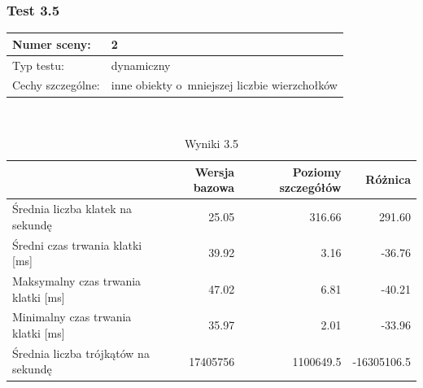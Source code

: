 \documentclass[a4paper,twoside,12pt]{book}
\begin{document}
\subsubsection{Test 3.5}
\begin{tabular}{|l||l|}
\hline
Numer sceny: & 2 \\
\hline
Typ testu: & dynamiczny \\
\hline
Cechy szczególne: & inne obiekty o~mniejszej liczbie wierzchołków \\
\hline
\end{tabular}\\

\begin{table}[H]
    \centering
    \caption{Wyniki 3.5}
    \label{tab:lod_test5}
    \begin{tabular}{|l||r|r|r|}
        \hline
        & Wersja bazowa & Poziomy szczegółów & Różnica \\
        \hline
        Średnia liczba klatek na sekundę & 25.05 & 316.66 & 291.60 \\
        \hline
        Średni czas trwania klatki [ms] & 39.92 & 3.16 & -36.76 \\
        \hline
        Maksymalny czas trwania klatki [ms] & 47.02 & 6.81 & -40.21 \\
        \hline
        Minimalny czas trwania klatki [ms] & 35.97 & 2.01 & -33.96 \\
        \hline
        Średnia liczba trójkątów na sekundę & 17405756 & 1100649.5 & -16305106.5 \\
        \hline
    \end{tabular}
\end{table}
\end{document}
